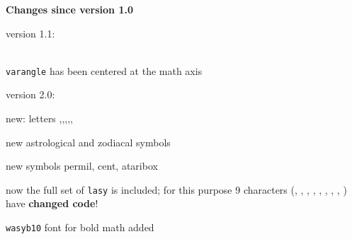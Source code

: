 \bigskip

{\bf Changes since version 1.0}

version 1.1:

{\tt\\varangle} has been centered at the math axis

version 2.0:

new: letters \Thorn,\thorn,\dh,\inve,\openo,\agemO

new astrological and zodiacal symbols

new symbols permil, cent, ataribox

now the full set of
{\tt lasy} is included; for this purpose 9 characters
(\smiley, \blacksmiley, \frownie, \sun,
\jupiter, \saturn, \uranus, \neptune, \pluto) have
{\bf changed code}!

{\tt wasyb10} font for bold math added

\bye
